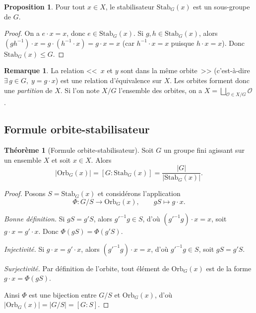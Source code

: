 \documentclass[12pt,a4paper,openany]{book}
\theoremstyle{definition}
\newtheorem{theoreme}{Théorème}[chapter]
\newtheorem{proposition}{Proposition}[chapter]
\newtheorem{remarque}{Remarque}[chapter]
\begin{document}
\begin{proposition}\label{prop:stab-sous-groupe}
  Pour tout $x\in X$, le stabilisateur $\mathrm{Stab}_G(x)$ est un
  sous-groupe de $G$.
\end{proposition}

\begin{proof}
  On a $e\cdot x = x$, donc $e\in\mathrm{Stab}_G(x)$. Si
  $g,h\in\mathrm{Stab}_G(x)$, alors
  $(gh^{-1})\cdot x = g\cdot(h^{-1}\cdot x) = g\cdot x = x$
  (car $h^{-1}\cdot x = x$ puisque $h\cdot x=x$). Donc
  $\mathrm{Stab}_G(x)\leq G$.
\end{proof}

\begin{remarque}\label{rem:orbites-partition}
  La relation <<~$x$ et $y$ sont dans la même orbite~>> (c'est-à-dire
  $\exists\, g\in G,\; y = g\cdot x$) est une relation d'équivalence
  sur $X$. Les orbites forment donc une \emph{partition} de $X$.
  Si l'on note $X/G$ l'ensemble des orbites, on a
  $X = \bigsqcup_{\mathcal{O}\in X/G}\mathcal{O}$.
\end{remarque}

\subsection{Formule orbite-stabilisateur}\label{subsec:orbite-stab}

\begin{theoreme}[Formule orbite-stabilisateur]\label{thm:orbite-stab}
  Soit $G$ un groupe fini agissant sur un ensemble $X$ et soit $x\in X$.
  Alors
  \[
    |\mathrm{Orb}_G(x)| = [G:\mathrm{Stab}_G(x)]
    = \frac{|G|}{|\mathrm{Stab}_G(x)|}.
  \]
\end{theoreme}

\begin{proof}
  Posons $S = \mathrm{Stab}_G(x)$ et considérons l'application
  \[
    \Phi\colon G/S \to \mathrm{Orb}_G(x),\qquad gS\mapsto g\cdot x.
  \]

  \emph{Bonne définition.} Si $gS = g'S$, alors $g'^{-1}g\in S$, d'où
  $(g'^{-1}g)\cdot x = x$, soit $g\cdot x = g'\cdot x$. Donc
  $\Phi(gS) = \Phi(g'S)$.

  \emph{Injectivité.} Si $g\cdot x = g'\cdot x$, alors
  $(g'^{-1}g)\cdot x = x$, d'où $g'^{-1}g\in S$, soit $gS = g'S$.

  \emph{Surjectivité.} Par définition de l'orbite, tout élément de
  $\mathrm{Orb}_G(x)$ est de la forme $g\cdot x = \Phi(gS)$.

  Ainsi $\Phi$ est une bijection entre $G/S$ et $\mathrm{Orb}_G(x)$,
  d'où $|\mathrm{Orb}_G(x)| = |G/S| = [G:S]$.
\end{proof}
\end{document}
